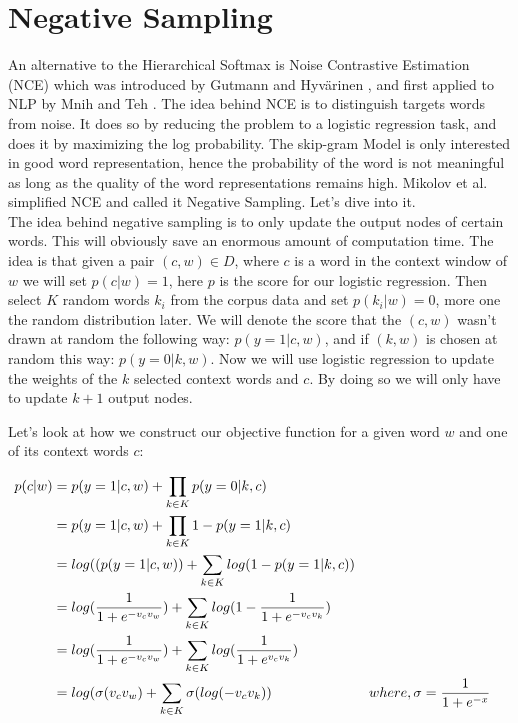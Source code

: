 \section{Negative Sampling}
An alternative to the Hierarchical Softmax is Noise Contrastive Estimation (NCE) which was introduced by Gutmann and Hyv{\"a}rinen \cite{nce-original},  and first applied to NLP by Mnih and Teh \cite{mnih}. The idea behind NCE is to distinguish targets words from noise. It does so by reducing the problem to a logistic regression task, and does it by maximizing the log probability. The skip-gram Model is only interested in good word representation, hence the probability of the word is not meaningful as long as the quality of the word representations remains high. Mikolov et al. \cite{mikolov2} simplified NCE and called it Negative Sampling. Let's dive into it.\\
The idea behind negative sampling is to only update the output nodes of certain words. This will obviously save an enormous amount of computation time. The idea is that given a pair $(c,w) \in D$, where $c$ is a word in the context window of $w$ we will set $p(c|w) =1$, here $p$ is the score for our logistic regression. Then select $K$ random words $k_i$ from the corpus data and set $p(k_i|w) = 0$, more one the random distribution later. We will denote the score that the $(c,w)$ wasn't drawn at random the following way: $p(y=1|c,w)$, and if $(k,w) $ is chosen at random this way: $p(y=0|k,w)$.  Now we will use logistic regression to update the weights of the $k$ selected context words and $c$. By doing so we will only have to update $k+1$ output nodes.

Let's look at how we construct our objective function for a given word $w$ and one of its context words $c$: 

\begin{align*} \label{obj_neg_samples}
p(c|w) &= p(y=1|c,w) + \prod_{k\in K} p(y=0|k,c) 
\\&= p(y=1|c,w) + \prod_{k\in K} 1- p(y=1|k,c) 
\\&= log((p(y=1|c,w)) + \sum_{k\in K} log(1- p(y=1|k,c)) 
\\&=  log(\frac{1}{1+e^{-v_c v_w }})  + \sum_{k\in K} log(1-\frac{1}{1+e^{-v_c v_k}}) 
\\&=  log(\frac{1}{1+e^{-v_c v_w }})  + \sum_{k\in K} log(\frac{1}{1+e^{v_c v_k }})
\\&= log(\sigma(v_c v_w ) + \sum_{k\in K} \sigma(log(-v_c v_k )) &&\text{$ where, \sigma = \frac{1}{1+e^{-x}}$}
\end{align*}

